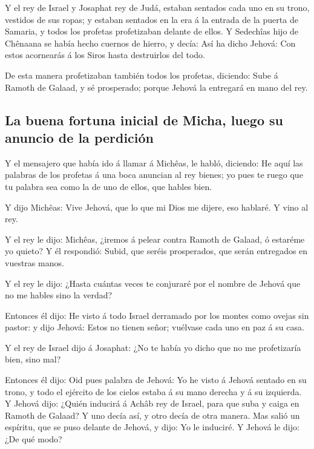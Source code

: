  Y el rey de Israel y Josaphat rey de Judá, estaban sentados
cada uno en su trono, vestidos de sus ropas; y estaban sentados en la
era á la entrada de la puerta de Samaria, y todos los profetas
profetizaban delante de ellos.  Y Sedechîas hijo de
Chênaana se había hecho cuernos de hierro, y decía: Así ha dicho Jehová:
Con estos acornearás á los Siros hasta destruirlos del todo.

 De esta manera profetizaban también todos los profetas,
diciendo: Sube á Ramoth de Galaad, y sé prosperado; porque Jehová la
entregará en mano del rey.

\hypertarget{la-buena-fortuna-inicial-de-micha-luego-su-anuncio-de-la-perdiciuxf3n}{%
\subsection{La buena fortuna inicial de Micha, luego su anuncio de la
perdición}\label{la-buena-fortuna-inicial-de-micha-luego-su-anuncio-de-la-perdiciuxf3n}}

 Y el mensajero que había ido á llamar á Michêas, le habló,
diciendo: He aquí las palabras de los profetas á una boca anuncian al
rey bienes; yo pues te ruego que tu palabra sea como la de uno de ellos,
que hables bien.

 Y dijo Michêas: Vive Jehová, que lo que mi Dios me dijere,
eso hablaré. Y vino al rey.

 Y el rey le dijo: Michêas, ¿iremos á pelear contra Ramoth
de Galaad, ó estaréme yo quieto? Y él respondió: Subid, que seréis
prosperados, que serán entregados en vuestras manos.

 Y el rey le dijo: ¿Hasta cuántas veces te conjuraré por el
nombre de Jehová que no me hables sino la verdad?

 Entonces él dijo: He visto á todo Israel derramado por los
montes como ovejas sin pastor: y dijo Jehová: Estos no tienen señor;
vuélvase cada uno en paz á su casa.

 Y el rey de Israel dijo á Josaphat: ¿No te había yo dicho
que no me profetizaría bien, sino mal?

 Entonces él dijo: Oid pues palabra de Jehová: Yo he visto
á Jehová sentado en su trono, y todo el ejército de los cielos estaba á
su mano derecha y á su izquierda.  Y Jehová dijo: ¿Quién
inducirá á Achâb rey de Israel, para que suba y caiga en Ramoth de
Galaad? Y uno decía así, y otro decía de otra manera.  Mas
salió un espíritu, que se puso delante de Jehová, y dijo: Yo le
induciré. Y Jehová le dijo: ¿De qué modo?


